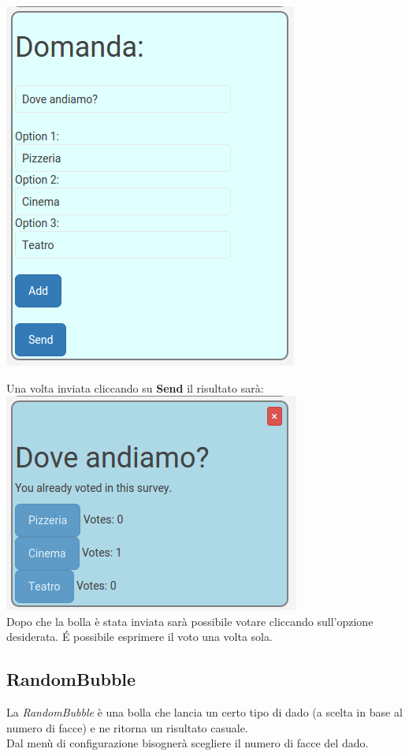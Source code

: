 \includegraphics[scale=0.75]{img/pollConfig.png}

Una volta inviata cliccando su \textbf{Send} il risultato sarà:\\

\includegraphics[scale=0.74]{img/poll.png}
\\
Dopo che la bolla è stata inviata sarà possibile votare cliccando sull'opzione desiderata. \'E possibile esprimere il voto una volta sola.
\subsection{RandomBubble}
La \textit{RandomBubble} è una bolla che lancia un certo tipo di dado (a scelta in base al numero di facce) e ne ritorna un risultato casuale.\\
Dal menù di configurazione bisognerà scegliere il numero di facce del dado.\\

